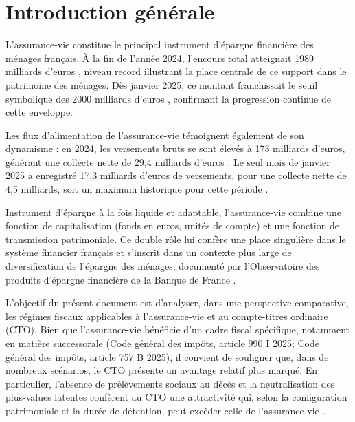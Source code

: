 \section*{Introduction générale}
\label{sec:introduction_generale}

L'assurance-vie constitue le principal instrument d'épargne financière des ménages français. À la fin de l'année 2024, l'encours total atteignait 1989 milliards d'euros \cite{assurance_vie_chiffres_2025}, niveau record illustrant la place centrale de ce support dans le patrimoine des ménages. Dès janvier 2025, ce montant franchissait le seuil symbolique des 2000 milliards d'euros \cite{assurance_vie_chiffres_2025}, confirmant la progression continue de cette enveloppe.

Les flux d'alimentation de l'assurance-vie témoignent également de son dynamisme : en 2024, les versements bruts se sont élevés à 173 milliards d'euros, générant une collecte nette de 29,4 milliards d'euros \cite{assurance_vie_chiffres_2025}. Le seul mois de janvier 2025 a enregistré 17,3 milliards d'euros de versements, pour une collecte nette de 4,5 milliards, soit un maximum historique pour cette période \cite{assurance_vie_chiffres_2025}.

Instrument d'épargne à la fois liquide et adaptable, l'assurance-vie combine une fonction de capitalisation (fonds en euros, unités de compte) et une fonction de transmission patrimoniale. Ce double rôle lui confère une place singulière dans le système financier français et s'inscrit dans un contexte plus large de diversification de l'épargne des ménages, documenté par l'Observatoire des produits d'épargne financière de la Banque de France \cite{rapport_observatoire_epargne_2025}.

L'objectif du présent document est d'analyser, dans une perspective comparative, les régimes fiscaux applicables à l'assurance-vie et au compte-titres ordinaire (CTO). Bien que l'assurance-vie bénéficie d'un cadre fiscal spécifique, notamment en matière successorale (Code général des impôts, article 990 I 2025; Code général des impôts, article 757 B 2025), il convient de souligner que, dans de nombreux scénarios, le CTO présente un avantage relatif plus marqué. En particulier, l'absence de prélèvements sociaux au décès et la neutralisation des plus-values latentes confèrent au CTO une attractivité qui, selon la configuration patrimoniale et la durée de détention, peut excéder celle de l'assurance-vie \cite{lechiquier_2019}.


